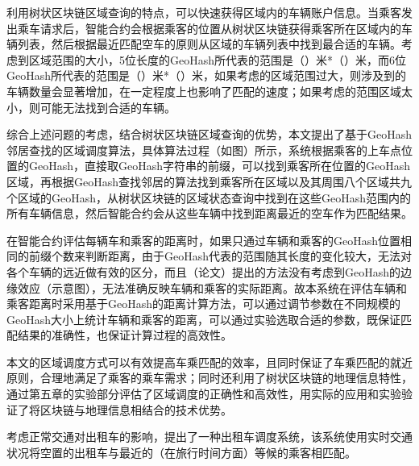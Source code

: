 利用树状区块链区域查询的特点，可以快速获得区域内的车辆账户信息。当乘客发出乘车请求后，智能合约会根据乘客的位置从树状区块链获得乘客所在区域内的车辆列表，然后根据最近匹配空车的原则从区域的车辆列表中找到最合适的车辆。考虑到区域范围的大小，5位长度的GeoHash所代表的范围是（）米*（）米，而6位GeoHash所代表的范围是（）米*（）米，如果考虑的区域范围过大，则涉及到的车辆数量会显著增加，在一定程度上也影响了匹配的速度；如果考虑的范围区域太小，则可能无法找到合适的车辆。

综合上述问题的考虑，结合树状区块链区域查询的优势，本文提出了基于GeoHash邻居查找的区域调度算法，具体算法过程（如图）所示，系统根据乘客的上车点位置的GeoHash，直接取GeoHash字符串的前缀，可以找到乘客所在位置的GeoHash区域，再根据GeoHash查找邻居的算法找到乘客所在区域以及其周围八个区域共九个区域的GeoHash，从树状区块链的区域状态查询中找到在这些GeoHash范围内的所有车辆信息，然后智能合约会从这些车辆中找到距离最近的空车作为匹配结果。

在智能合约评估每辆车和乘客的距离时，如果只通过车辆和乘客的GeoHash位置相同的前缀个数来判断距离，由于GeoHash代表的范围随其长度的变化较大，无法对各个车辆的远近做有效的区分，而且（论文）提出的方法没有考虑到GeoHash的边缘效应（示意图），无法准确反映车辆和乘客的实际距离。故本系统在评估车辆和乘客距离时采用基于GeoHash的距离计算方法，可以通过调节参数在不同规模的GeoHash大小上统计车辆和乘客的距离，可以通过实验选取合适的参数，既保证匹配结果的准确性，也保证计算过程的高效性。

本文的区域调度方式可以有效提高车乘匹配的效率，且同时保证了车乘匹配的就近原则，合理地满足了乘客的乘车需求；同时还利用了树状区块链的地理信息特性，通过第五章的实验部分评估了区域调度的正确性和高效性，用实际的应用和实验验证了将区块链与地理信息相结合的技术优势。

考虑正常交通对出租车的影响，提出了一种出租车调度系统，该系统使用实时交通状况将空置的出租车与最近的（在旅行时间方面）等候的乘客相匹配。